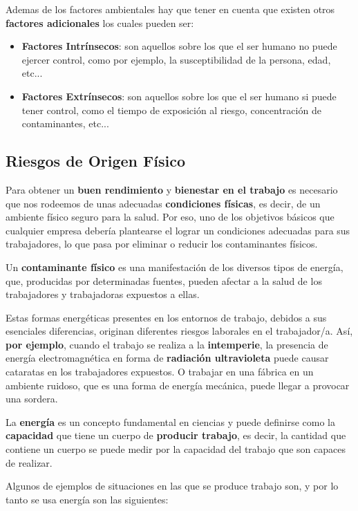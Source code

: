 Ademas de los factores ambientales hay que tener en cuenta que existen otros \textbf{factores adicionales} los cuales pueden ser:

\begin{itemize}
    \item \textbf{Factores Intrínsecos}: son aquellos sobre los que el ser humano no puede ejercer control, como por ejemplo, la susceptibilidad de la persona, edad, etc...
    \item \textbf{Factores Extrínsecos}: son aquellos sobre los que el ser humano si puede tener control, como el tiempo de exposición al riesgo, concentración de contaminantes, etc...
\end{itemize}

\subsection{Riesgos de Origen Físico}
Para obtener un \textbf{buen rendimiento} y \textbf{bienestar en el trabajo} es necesario que nos rodeemos de unas adecuadas \textbf{condiciones físicas}, es decir, de un ambiente físico seguro para la salud. Por eso, uno de los objetivos básicos que cualquier empresa debería plantearse el lograr un condiciones adecuadas para sus trabajadores, lo que pasa por eliminar o reducir los contaminantes físicos.

Un \textbf{contaminante físico} es una manifestación de los diversos tipos de energía, que, producidas por determinadas fuentes, pueden afectar a la salud de los trabajadores y trabajadoras expuestos a ellas.

Estas formas energéticas presentes en los entornos de trabajo, debidos a sus esenciales diferencias, originan diferentes riesgos laborales en el trabajador/a. Así, \textbf{por ejemplo}, cuando el trabajo se realiza a la \textbf{intemperie}, la presencia de energía electromagnética en forma de \textbf{radiación ultravioleta} puede causar cataratas en los trabajadores expuestos. O trabajar en una fábrica en un ambiente ruidoso, que es una forma de energía mecánica, puede llegar a provocar una sordera.

La \textbf{energía} es un concepto fundamental en ciencias y puede definirse como la \textbf{capacidad} que tiene un cuerpo de \textbf{producir trabajo}, es decir, la cantidad que contiene un cuerpo se puede medir por la capacidad del trabajo que son capaces de realizar.

Algunos de ejemplos de situaciones en las que se produce trabajo son, y por lo tanto se usa energía son las siguientes:

